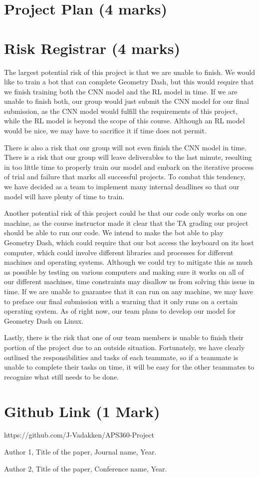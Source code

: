 \documentclass{article}
\begin{document}
\section{Project Plan (4 marks)}

\section{Risk Registrar (4 marks)}
The largest potential risk of this project is that we are unable to 
finish. We would like to train a bot that can complete Geometry Dash, 
but this would require that we finish training both the CNN model and 
the RL model in time. If we are unable to finish both, our group would 
just submit the CNN model for our final submission, as the CNN model 
would fulfill the requirements of this project, while the RL model is 
beyond the scope of this course. Although an RL model would be nice, 
we may have to sacrifice it if time does not permit. 

There is also a risk that our group will not even finish the CNN model 
in time. There is a risk that our group will leave deliverables to the 
last minute, resulting in too little time to properly train our model 
and embark on the iterative process of trial and failure that marks all
successful projects. To combat this tendency, we have decided as a team 
to implement many internal deadlines so that our model will have plenty 
of time to train.

Another potential risk of this project could be that our code only works
on one machine, as the course instructor made it clear that the TA grading
our project should be able to run our code. We intend to make the bot 
able to play Geometry Dash, which could require that our bot access the 
keyboard on its host computer, which could involve different libraries 
and processes for different machines and operating systems. Although 
we could try to mitigate this as much as possible by testing on various 
computers and making sure it works on all of our different machines, time
constraints may disallow us from solving this issue in time. If we are 
unable to guarantee that it can run on any machine, we may have to preface 
our final submission with a warning that it only runs on a certain 
operating system. As of right now, our team plans to develop our model 
for Geometry Dash on Linux. 

Lastly, there is the risk that one of our team members is unable to finish
their portion of the project due to an outside situation. Fortunately, 
we have clearly outlined the responsibilities and tasks of each teammate, 
so if a teammate is unable to complete their tasks on time, it will be 
easy for the other teammates to recognize what still needs to be done.


\section{Github Link (1 Mark)}
https://github.com/J-Vadakken/APS360-Project

\begin{thebibliography}{9}
Author 1, Title of the paper, Journal name, Year.

Author 2, Title of the paper, Conference name, Year.
\end{thebibliography}
\end{document}

